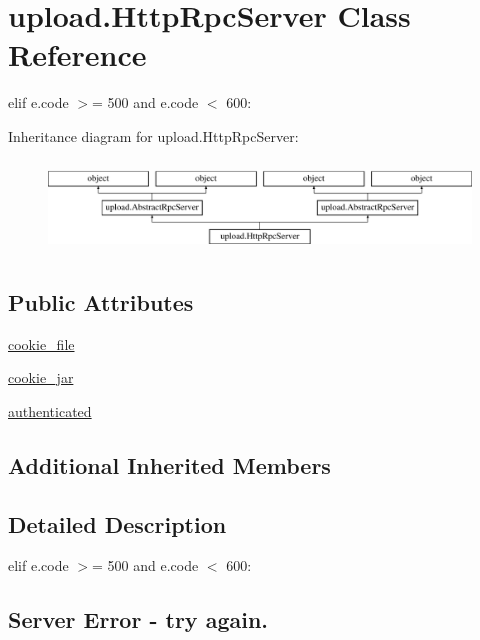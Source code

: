 \hypertarget{classupload_1_1HttpRpcServer}{}\section{upload.\+Http\+Rpc\+Server Class Reference}
\label{classupload_1_1HttpRpcServer}


elif e.\+code $>$= 500 and e.\+code $<$ 600\+:  


Inheritance diagram for upload.\+Http\+Rpc\+Server\+:\begin{figure}[H]
\begin{center}
\leavevmode
\includegraphics[height=2.470588cm]{classupload_1_1HttpRpcServer}
\end{center}
\end{figure}
\subsection*{Public Attributes}
\begin{DoxyCompactItemize}
\item 
\mbox{\hyperlink{classupload_1_1HttpRpcServer_ad5c1a730c030f9d3b5f70c2e0d8b9a1d}{cookie\+\_\+file}}
\item 
\mbox{\hyperlink{classupload_1_1HttpRpcServer_a1b9c9af7f0a46afd84a9d524782323bf}{cookie\+\_\+jar}}
\item 
\mbox{\hyperlink{classupload_1_1HttpRpcServer_aaa356e2491537dd0d4bfc5b1bb0fec96}{authenticated}}
\end{DoxyCompactItemize}
\subsection*{Additional Inherited Members}


\subsection{Detailed Description}
elif e.\+code $>$= 500 and e.\+code $<$ 600\+: 

\subsection*{Server Error -\/ try again.}

